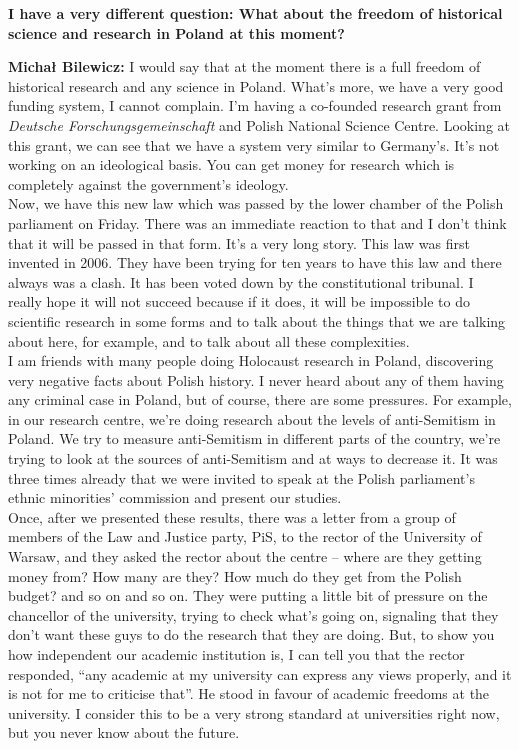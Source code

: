 \textbf{I have a very different question: What about the freedom of historical science and research in Poland at this moment?} 

\textbf{Michał Bilewicz:} I would say that at the moment there is a full freedom of historical research and any science in Poland. What’s more, we have a very good funding system, I cannot complain. I’m having a co-founded research grant from \textit{Deutsche Forschungsgemeinschaft} and Polish National Science Centre. Looking at this grant, we can see that we have a system very similar to Germany's. It's not working on an ideological basis. You can get money for research which is completely against the government’s ideology.\\
Now, we have this new law which was passed by the lower chamber of the Polish parliament on Friday. There was an immediate reaction to that and I don’t think that it will be passed in that form. It’s a very long story. This law was first invented in 2006. They have been trying for ten years to have this law and there always was a clash. It has been voted down by the constitutional tribunal. I really hope it will not succeed because if it does, it will be impossible to do scientific research in some forms and to talk about the things that we are talking about here, for example, and to talk about all these complexities.\\
I am friends with many people doing Holocaust research in Poland, discovering very negative facts about Polish history. I never heard about any of them having any criminal case in Poland, but of course, there are some pressures. For example, in our research centre, we’re doing research about the levels of anti-Semitism in Poland. We try to measure anti-Semitism in different parts of the country, we're trying to look at the sources of anti-Semitism and at ways to decrease it. It was three times already that we were invited to speak at the Polish parliament’s ethnic minorities’ commission and present our studies.\\
Once, after we presented these results, there was a letter from a group of members of the Law and Justice party, PiS, to the rector of the University of Warsaw, and they asked the rector about the centre – where are they getting money from? How many are they? How much do they get from the Polish budget? and so on and so on. They were putting a little bit of pressure on the chancellor of the university, trying to check what’s going on, signaling that they don’t want these guys to do the research that they are doing. But, to show you how independent our academic institution is, I can tell you that the rector responded, ``any academic at my university can express any views properly, and it is not for me to criticise that''. He stood in favour of academic freedoms at the university. I consider this to be a very strong standard at universities right now, but you never know about the future.

